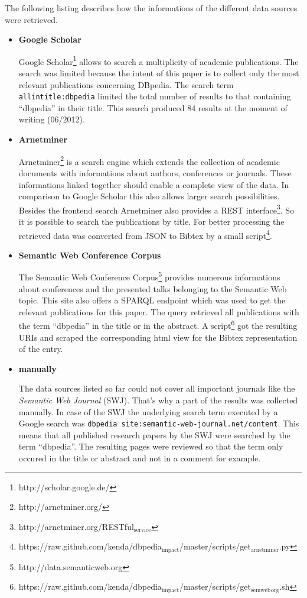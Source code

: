 \documentclass[english]{lni}
\begin{document}
   The following listing describes how the informations of the
   different data sources were retrieved.
\begin{itemize}
\item \textbf{Google Scholar}

     Google Scholar\footnote{http://scholar.google.de/ } allows to search a multiplicity of academic
     publications. The search was limited because the intent of this paper is to
     collect only the most relevant publications concerning DBpedia. The search
     term \texttt{allintitle:dbpedia} limited the total number of results to that
     containing ``dbpedia'' in their title. This search produced 84 results at the
     moment of writing (06/2012).
\item \textbf{Arnetminer}

     Arnetminer\footnote{http://arnetminer.org/ } is a search engine which extends the collection of
     academic documents with informations about authors, conferences or
     journals. These informations linked together should enable a complete view
     of the data. In comparison to Google Scholar this also allows larger search
     possibilities. Besides the frontend search Arnetminer also provides a REST
     interface\footnote{http://arnetminer.org/RESTful$_{\mathrm{service}}$ }. So it is possible to search the publications by title. For
     better processing the retrieved data was converted from JSON to Bibtex by a
     small script\footnote{https://raw.github.com/kenda/dbpedia$_{\mathrm{impact}}$/master/scripts/get$_{\mathrm{arnetminer}}$.py }.
\item \textbf{Semantic Web Conference Corpus}

     The Semantic Web Conference Corpus\footnote{http://data.semanticweb.org } provides numerous informations about
     conferences and the presented talks belonging to the Semantic Web
     topic. This site also offers a SPARQL endpoint which was used to get the
     relevant publications for this paper. The query retrieved all publications
     with the term ``dbpedia'' in the title or in the abstract. A script\footnote{https://raw.github.com/kenda/dbpedia$_{\mathrm{impact}}$/master/scripts/get$_{\mathrm{semweb}}$$_{\mathrm{org}}$.sh } got
     the resulting URIs and scraped the corresponding html view for the Bibtex
     representation of the entry.
\item \textbf{manually}

     The data sources listed so far could not cover all important journals like
     the \emph{Semantic Web Journal} (SWJ). That's why a part of the results was
     collected manually. In case of the SWJ the underlying search term executed by a Google
     search was \texttt{dbpedia site:semantic-web-journal.net/content}. This means that all published research papers by the SWJ were
     searched by the term ``dbpedia''. The resulting pages were reviewed so that the
     term only occured in the title or abstract and not in a comment for example.
\end{itemize}
\end{document}
